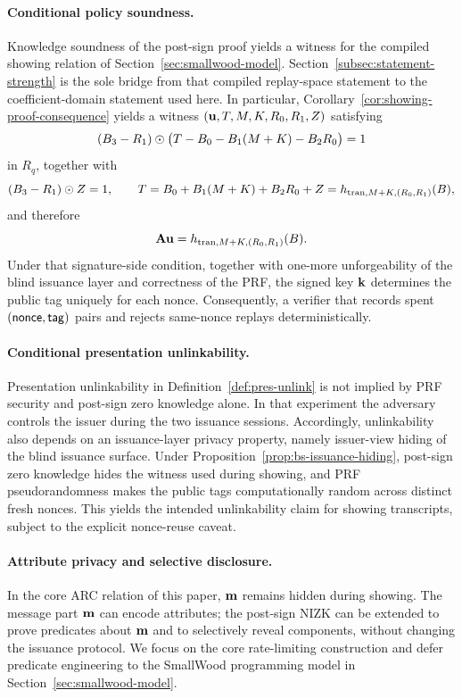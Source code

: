 \paragraph{Conditional policy soundness.}
Knowledge soundness of the post-sign proof yields a witness for the compiled showing relation of
Section~\ref{sec:smallwood-model}. Section~\ref{subsec:statement-strength} is the sole bridge from that compiled
replay-space statement to the coefficient-domain statement used here. In particular,
Corollary~\ref{cor:showing-proof-consequence} yields a witness \((\mathbf{u},T,M,K,R_0,R_1,Z)\) satisfying
\[
(B_3-R_1)\odot\bigl(T-B_0-B_1(M+K)-B_2R_0\bigr)=1
\]
in \(R_q\), together with
\[
(B_3-R_1)\odot Z = 1,
\qquad
T = B_0+B_1(M+K)+B_2R_0+Z = h_{\mathrm{tran},M+K,(R_0,R_1)}(B),
\]
and therefore
\[
\mathbf{A} \mathbf{u} = h_{\mathrm{tran},M+K,(R_0,R_1)}(B).
\]
Under that signature-side condition, together with one-more unforgeability of the blind issuance layer and correctness
of the PRF, the signed key \(\mathbf{k}\) determines the public tag uniquely for each nonce. Consequently, a verifier that
records spent \((\mathsf{nonce},\mathsf{tag})\) pairs and rejects same-nonce replays deterministically.

\paragraph{Conditional presentation unlinkability.}
Presentation unlinkability in Definition~\ref{def:pres-unlink} is not implied by PRF security and post-sign zero
knowledge alone. In that experiment the adversary controls the issuer during the two issuance sessions. Accordingly,
unlinkability also depends on an issuance-layer privacy property, namely issuer-view hiding of the blind
issuance surface. Under Proposition~\ref{prop:bs-issuance-hiding}, post-sign zero knowledge hides the witness used
during showing, and PRF pseudorandomness makes the public tags computationally random across distinct fresh nonces.
This yields the intended unlinkability claim for showing transcripts, subject to the explicit nonce-reuse caveat.

\paragraph{Attribute privacy and selective disclosure.}
In the core ARC relation of this paper, \(\mathbf{m}\) remains hidden during showing. The message part \(\mathbf{m}\) can
encode attributes; the post-sign NIZK can be extended to prove predicates about \(\mathbf{m}\) and to selectively reveal
components, without changing the issuance protocol. We focus on the core rate-limiting construction and defer
predicate engineering to the SmallWood programming model in Section~\ref{sec:smallwood-model}.
